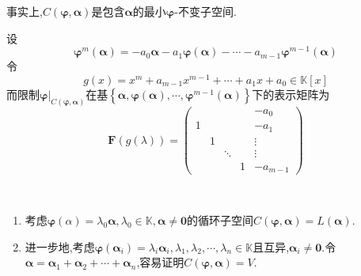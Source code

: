 \begin{green}
\begin{corollary}[最小不变子空间]\label{cor:最小不变子空间}
    事实上,$C\left(
        \bm{\varphi},\bm{\alpha}
    \right)$是包含$\bm{\alpha}$的最小$\bm{\varphi}$-不变子空间.
\end{corollary}
\end{green}
\begin{green}
    \begin{corollary}[限制的表示矩阵]\label{cor:限制的表示矩阵}
设\[
\bm{\varphi}^m\left(\bm{\alpha}\right)=-a_0\bm{\alpha}-a_1\bm{\varphi}\left(\bm{\alpha}\right)-\cdots-a_{m-1}\bm{\varphi}^{m-1}\left(\bm{\alpha}\right)
\]令\[
g\left(x\right)=x^m+a_{m-1}x^{m-1}+\cdots+a_1x+a_0\in \mathbb{K}\left[x\right]
\]而限制$\bm{\varphi}\Big|_{C\left(
    \bm{\varphi},\bm{\alpha}
\right)}$在基$\left\{
    \bm{\alpha},\bm{\varphi}\left(\bm{\alpha}\right),\cdots,\bm{\varphi}^{m-1}\left(\bm{\alpha}\right)
\right\}$下的表示矩阵为\[
\bm{F}\left(g\left(\lambda\right)\right)=\begin{pmatrix}
    &&&&-a_0\\
    1&&&&-a_1\\
    &1&&&\vdots\\
    &&\ddots&&\vdots\\
    &&&1&-a_{m-1}
\end{pmatrix}
\]    
    \end{corollary}
\end{green}
\begin{brown}
    \begin{example}\,

        \begin{enumerate}[label={\textup{(\arabic*)}}]
            \item 考虑$\bm{\varphi}\left(\alpha\right)=\lambda_0\bm{\alpha},\lambda_0\in\mathbb{K},\bm{\alpha}\neq \bm{0}$的循环子空间$C\left(
                \bm{\varphi},\bm{\alpha}
            \right)=L\left(
                \bm{\alpha}
            \right)$.
            
            \item 进一步地,考虑$\bm{\varphi}\left(\bm{\alpha}_i\right)=\lambda_i\bm{\alpha}_i,\lambda_1,\lambda_2,\cdots,\lambda_n\in\mathbb{K}$且互异,$\bm{\alpha}_i\neq\bm{0}$.令$\bm{\alpha}=\bm{\alpha}_1+\bm{\alpha}_2+\cdots+\bm{\alpha}_n$,容易证明$C\left(
                \bm{\varphi},\bm{\alpha}
            \right)=V$.
        \end{enumerate}
    \end{example}
\end{brown}
